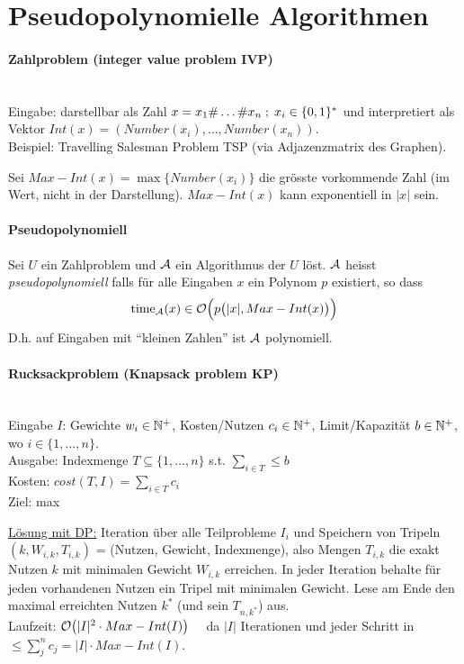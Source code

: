 \section{Pseudopolynomielle Algorithmen}

\paragraph{Zahlproblem (integer value problem IVP)} \mbox{} \\
Eingabe: darstellbar als Zahl $ x = x_1 \# \dots \# x_n \; ; \; x_i \in \lbrace 0, 1 \rbrace^* $
und interpretiert als Vektor $Int(x) = (Number(x_i), \dots, Number(x_n))$. \\
Beispiel: Travelling Salesman Problem TSP (via Adjazenzmatrix des Graphen).

Sei $Max-Int(x) = \max \{ Number(x_i) \}$ die grösste vorkommende Zahl (im Wert, nicht in der Darstellung).
$Max-Int(x)$ kann exponentiell in $|x|$ sein.

\paragraph{Pseudopolynomiell}
Sei $U$ ein Zahlproblem und $\mathcal{A}$ ein Algorithmus der $U$ löst.
$\mathcal{A}$ heisst \emph{pseudopolynomiell} falls für alle Eingaben $x$ ein Polynom $p$ existiert, so dass
$$ \text{time}_{\mathcal{A}} (x) \in \mathcal{O} \Big( p \big( |x| , Max-Int(x) \big) \Big) $$
D.h. auf Eingaben mit ``kleinen Zahlen'' ist $\mathcal{A}$ polynomiell.

\paragraph{Rucksackproblem (Knapsack problem KP)} \mbox{} \\
Eingabe $I$: Gewichte $w_i \in \mathbb{N}^+$, Kosten/Nutzen $c_i \in \mathbb{N}^+$, Limit/Kapazität $b \in \mathbb{N}^+$, wo $i \in \{ 1, \dots, n \} $. \\
Ausgabe: Indexmenge $T \subseteq \{ 1, \dots, n \}$ s.t. $\sum_{i \in T } \leq b$ \\
Kosten: $cost(T, I) = \sum_{i \in T} c_i$ \\
Ziel: max

\underline{Lösung mit DP:}
Iteration über alle Teilprobleme $I_i$ und Speichern von Tripeln
$(k, W_{i, k}, T_{i, k})$ = (Nutzen, Gewicht, Indexmenge), also Mengen $T_{i, k}$
die exakt Nutzen $k$ mit minimalen Gewicht $W_{i, k}$ erreichen.
In jeder Iteration behalte für jeden vorhandenen Nutzen ein Tripel mit minimalen Gewicht.
Lese am Ende den maximal erreichten Nutzen $k^*$ (und sein $T_{n, k^*}$) aus.
\\
Laufzeit: $ \mathcal{O} \big( |I|^2 \cdot Max-Int(I) \big) \quad$ da $|I|$ Iterationen und
jeder Schritt in $\leq \sum_j^n c_j = |I| \cdot Max-Int(I)$.

